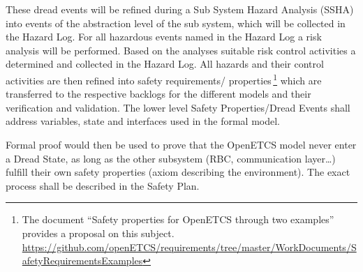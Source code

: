 \documentclass{template/openetcs_article}
\begin{document}
These dread events will be refined during a Sub System Hazard Analysis (SSHA) into events of the abstraction level of the sub system, 
which will be collected in the Hazard Log. For all hazardous events named in the Hazard Log a risk analysis will be performed.
Based on the analyses suitable risk control activities a determined and collected in the Hazard Log. All hazards and their 
control activities are then refined into safety requirements/ properties\,\footnote{The document ``Safety properties for 
OpenETCS through two examples'' provides a proposal on this subject.
\url{https://github.com/openETCS/requirements/tree/master/WorkDocuments/SafetyRequirementsExamples}} which are transferred 
to the respective backlogs for the different models and their verification and validation.
The lower level Safety Properties/Dread Events shall address variables, state and interfaces used in the formal model.

Formal proof would then be used to prove that the OpenETCS model never enter a Dread State, 
as long as the other subsystem (RBC, communication layer\dots) fulfill their own safety properties 
(axiom describing the environment). The exact process shall be described in the Safety Plan.
 





\end{document}

